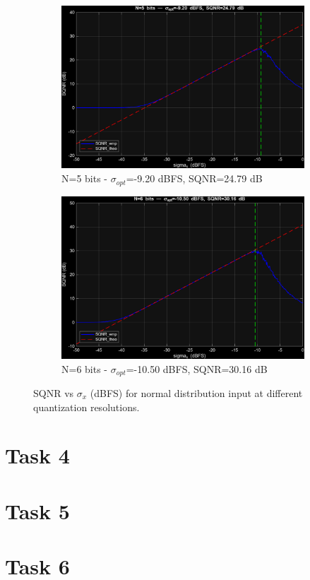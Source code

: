 \documentclass[11pt,a4paper]{article}
\begin{document}
\begin{figure}[H]
    \begin{subfigure}[t]{.4\textwidth}
        \centering
        \includegraphics[width=\linewidth]{img/task3_normal_n5.png}
        \caption{N=5 bits - $\sigma_{opt}$=-9.20 dBFS, SQNR=24.79 dB}
    \end{subfigure}
    \hfill
    \begin{subfigure}[t]{.4\textwidth}
        \centering
        \includegraphics[width=\linewidth]{img/task3_normal_n6.png}
        \caption{N=6 bits - $\sigma_{opt}$=-10.50 dBFS, SQNR=30.16 dB}
    \end{subfigure}

    \caption{SQNR vs $\sigma_x$ (dBFS) for normal distribution input at different quantization resolutions.}
    \label{fig:task3_normal_sqnr_vs_sigma}
\end{figure}

\vspace{0.5cm}
\section{Task 4}


\vspace{0.5cm}
\section{Task 5}


\vspace{0.5cm}
\section{Task 6}



\end{document}
